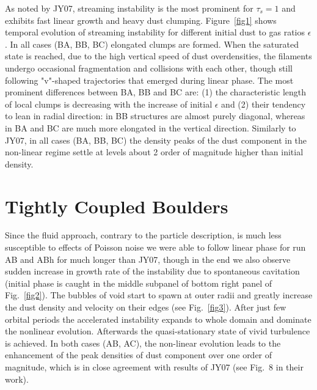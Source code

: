 %
As noted by JY07, streaming instability is the most prominent for $\tau_s = 1$
and exhibits fast linear growth and heavy dust clumping.  Figure~\ref{fig1}
shows temporal evolution of streaming instability for different initial dust to
gas ratios $\epsilon$. In all cases (BA, BB, BC) elongated clumps are formed.
When the saturated state is reached, due to the high vertical speed of dust
overdensities, the filaments undergo occasional fragmentation and collisions
with each other, though still following "v"-shaped trajectories that emerged
during linear phase. The most prominent differences between BA, BB and BC are:
(1) the characteristic length of local clumps is decreasing with the increase of
initial $\epsilon$ and (2) their tendency to lean in radial direction: in BB
structures are almost purely diagonal, whereas in BA and BC are much more
elongated in the vertical direction.
Similarly to JY07, in all cases (BA, BB, BC) the density peaks of the dust
component in the non-linear regime settle at levels about 2 order of magnitude
higher than initial density.

\section{Tightly Coupled Boulders}

Since the fluid approach, contrary to the particle description, is much less
susceptible to effects of Poisson noise we were able to follow linear phase for
run AB and ABh for much longer than JY07, though in the end we also observe
sudden increase in growth rate of the instability due to spontaneous cavitation
(initial phase is caught in the middle subpanel of bottom right panel of
Fig.~\ref{fig2}).
The bubbles of void start to spawn at outer radii and greatly increase the dust
density and velocity on their edges (see Fig.~\ref{fig3}). After just
few orbital periods the accelerated instability expands to whole domain and
dominate the nonlinear evolution. Afterwards the quasi-stationary state of
vivid turbulence is achieved. 
In both cases (AB, AC), the non-linear evolution leads to the enhancement
of the peak densities of dust component over one order of magnitude, which is in
close agreement with results of JY07 (see Fig.~8 in their work).

